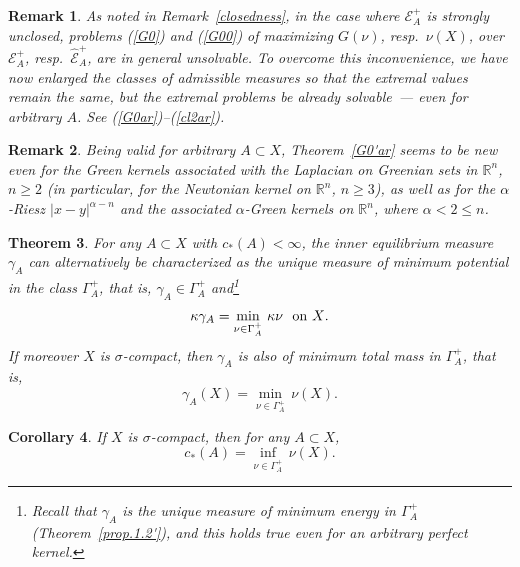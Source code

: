 \documentclass[12pt,a4paper,reqno]{amsart} %
\theoremstyle{lause}
\theoremstyle{maaritelma}
\theoremstyle{lause}
\newtheorem{theorem}{Theorem}[section]
\newtheorem{corollary}[theorem]{Corollary}
\theoremstyle{maaritelma}
\newtheorem{remark}[theorem]{Remark}
\numberwithin{equation}{section}
\begin{document}
\begin{remark}As noted in Remark~\ref{closedness}, in the case where $\mathcal E^+_A$ is strongly unclosed, problems (\ref{G0}) and (\ref{G00}) of maximizing $G(\nu)$, resp.\ $\nu(X)$, over $\mathcal E^+_A$, resp.\ $\widehat{\mathcal E}^+_A$, are in general {\it unsolvable}. To overcome this inconvenience, we have now enlarged the classes of admissible measures so that {\it the extremal values remain the same}, but {\it the extremal problems be already solvable}~--- even for arbitrary $A$. See (\ref{G0ar})--(\ref{cl2ar}).
\end{remark}

\begin{remark}Being valid for arbitrary $A\subset X$, Theorem~\ref{G0'ar} seems to be new even for the Green kernels associated with the Laplacian on Greenian sets in $\mathbb R^n$, $n\geqslant2$ (in particular, for the Newtonian kernel on $\mathbb R^n$, $n\geqslant3$), as well as for the $\alpha$-Riesz $|x-y|^{\alpha-n}$ and the associated $\alpha$-Green kernels on $\mathbb R^n$, where $\alpha<2\leqslant n$.\end{remark}

\begin{theorem}\label{th-char} For any\/ $A\subset X$ with\/ $c_*(A)<\infty$, the inner equilibrium measure\/ $\gamma_A$ can alternatively be characterized as the unique measure of minimum potential
in the class\/ $\Gamma^+_A$, that is, $\gamma_A\in\Gamma^+_A$ and\/\footnote{Recall that $\gamma_A$ is the unique measure of minimum {\it energy\/} in $\Gamma^+_A$ (Theorem~\ref{prop.1.2'}), and this holds true even for an arbitrary perfect kernel.}
\begin{equation}
\label{eq-char-p}\kappa\gamma_A=\min_{\nu\in\Gamma_A^+}\,\kappa\nu\text{ \ on\/ $X$.}\end{equation}
If moreover\/ $X$ is\/ $\sigma$-compact, then\/ $\gamma_A$ is also of minimum total mass in\/ $\Gamma^+_A$, that is,
\begin{equation}\label{eq-char-m}\gamma_A(X)=\min_{\nu\in\Gamma_A^+}\,\nu(X).\end{equation}
\end{theorem}

\begin{corollary}\label{cor-char}If\/ $X$ is\/ $\sigma$-compact, then for any\/ $A\subset X$,
\begin{equation}c_*(A)=\inf_{\nu\in\Gamma^+_A}\,\nu(X).\label{ch-i-cap'00}\end{equation}
\end{corollary}
\end{document}
